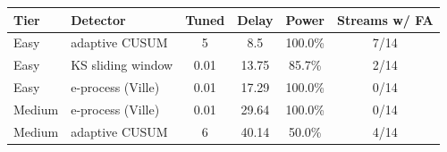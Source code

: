 \begin{tabular}{llcccc}
\toprule
Tier & Detector & Tuned & Delay & Power & Streams w/ FA \\
\midrule
Easy & adaptive CUSUM & 5 & 8.5 & 100.0\% & 7/14 \\
Easy & KS sliding window & 0.01 & 13.75 & 85.7\% & 2/14 \\
Easy & e-process (Ville) & 0.01 & 17.29 & 100.0\% & 0/14 \\
Medium & e-process (Ville) & 0.01 & 29.64 & 100.0\% & 0/14 \\
Medium & adaptive CUSUM & 6 & 40.14 & 50.0\% & 4/14 \\
\bottomrule
\end{tabular}
